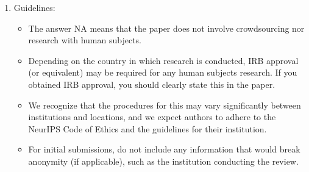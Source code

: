 \documentclass{article}
\theoremstyle{plain}
\theoremstyle{definition}
\theoremstyle{remark}
\begin{document}
\begin{enumerate}
    \item[] Guidelines:
    \begin{itemize}
        \item The answer NA means that the paper does not involve crowdsourcing nor research with human subjects.
        \item Depending on the country in which research is conducted, IRB approval (or equivalent) may be required for any human subjects research. If you obtained IRB approval, you should clearly state this in the paper. 
        \item We recognize that the procedures for this may vary significantly between institutions and locations, and we expect authors to adhere to the NeurIPS Code of Ethics and the guidelines for their institution. 
        \item For initial submissions, do not include any information that would break anonymity (if applicable), such as the institution conducting the review.
    \end{itemize}
\end{enumerate}
\end{document}
